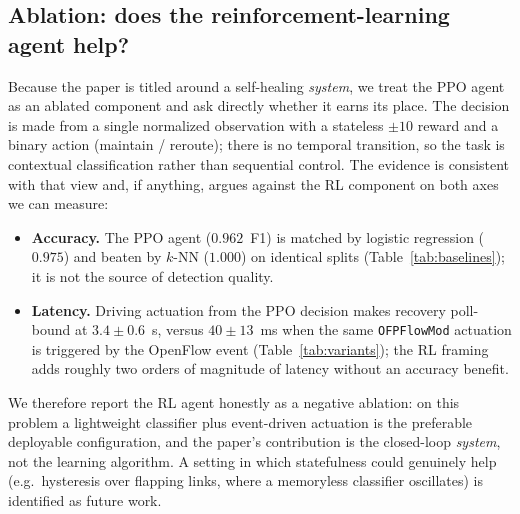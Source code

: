 \documentclass[conference]{IEEEtran}
\begin{document}
\subsection{Ablation: does the reinforcement-learning agent help?}
\label{sec:ablation}
Because the paper is titled around a self-healing \emph{system}, we treat the PPO
agent as an ablated component and ask directly whether it earns its place. The
decision is made from a single normalized observation with a stateless $\pm10$
reward and a binary action (maintain / reroute); there is no temporal transition,
so the task is contextual classification rather than sequential control. The
evidence is consistent with that view and, if anything, argues against the RL
component on both axes we can measure:
\begin{itemize}
  \item \textbf{Accuracy.} The PPO agent ($0.962$~F1) is matched by logistic
  regression ($0.975$) and beaten by $k$-NN ($1.000$) on identical splits
  (Table~\ref{tab:baselines}); it is not the source of detection quality.
  \item \textbf{Latency.} Driving actuation from the PPO decision makes recovery
  poll-bound at $3.4\pm0.6$~s, versus $40\pm13$~ms when the same
  \texttt{OFPFlowMod} actuation is triggered by the OpenFlow event
  (Table~\ref{tab:variants}); the RL framing adds roughly two orders of magnitude
  of latency without an accuracy benefit.
\end{itemize}
We therefore report the RL agent honestly as a negative ablation: on this problem a
lightweight classifier plus event-driven actuation is the preferable deployable
configuration, and the paper's contribution is the closed-loop \emph{system}, not
the learning algorithm. A setting in which statefulness could genuinely help
(e.g.\ hysteresis over flapping links, where a memoryless classifier oscillates)
is identified as future work.
\end{document}

